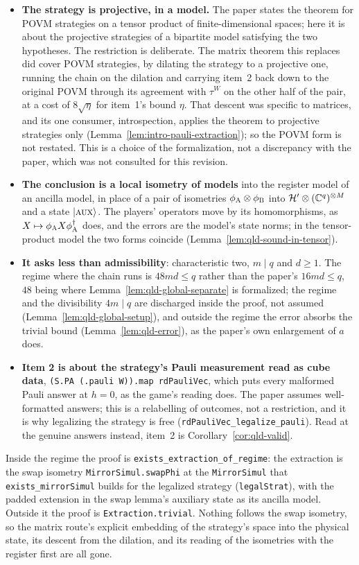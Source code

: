 \begin{itemize}
\item \textbf{The strategy is projective, in a model.} The paper states the theorem for POVM
  strategies on a tensor product of finite-dimensional spaces; here it is about the projective
  strategies of a bipartite model satisfying the two hypotheses. The restriction is deliberate.
  The matrix theorem this replaces did cover POVM strategies, by dilating the strategy to a
  projective one, running the chain on the dilation and carrying item~2 back down to the
  original POVM through its agreement with $\tau^W$ on the other half of the pair, at a cost of
  $8\sqrt{\eta}$ for item~1's bound $\eta$. That descent was specific to matrices, and its one
  consumer, introspection, applies the theorem to projective strategies only
  (Lemma~\ref{lem:intro-pauli-extraction}); so the POVM form is not restated. This is a choice of
  the formalization, not a discrepancy with the paper, which was not consulted for this revision.
\item \textbf{The conclusion is a local isometry of models} into the register model of an ancilla
  model, in place of a pair of isometries $\phi_{\textsc{A}} \otimes \phi_{\textsc{B}}$ into
  $\mathcal{H}' \otimes (\mathbb{C}^q)^{\otimes M}$ and a state $|\textsc{aux}\rangle$. The players' operators move by its
  homomorphisms, as $X \mapsto \phi_{\textsc{A}} X \phi_{\textsc{A}}^\dagger$ does, and the errors are the
  model's state norms; in the tensor-product model the two forms coincide
  (Lemma~\ref{lem:qld-sound-in-tensor}).
\item \textbf{It asks less than admissibility}: characteristic two, $m \mid q$ and $d \geq 1$. The
  regime where the chain runs is $48md \leq q$ rather than the paper's $16md \leq q$, $48$ being
  where Lemma~\ref{lem:qld-global-separate} is formalized; the regime and the divisibility
  $4m \mid q$ are discharged inside the proof, not assumed (Lemma~\ref{lem:qld-global-setup}), and
  outside the regime the error absorbs the trivial bound (Lemma~\ref{lem:qld-error}), as the
  paper's own enlargement of $a$ does.
\item \textbf{Item 2 is about the strategy's Pauli measurement read as cube data},
  \texttt{(S.PA (.pauli W)).map rdPauliVec}, which puts every malformed Pauli answer at $h = 0$,
  as the game's reading does. The paper assumes well-formatted answers; this is a relabelling of
  outcomes, not a restriction, and it is why legalizing the strategy is free
  (\texttt{rdPauliVec\_legalize\_pauli}). Read at the genuine answers instead, item~2 is
  Corollary~\ref{cor:qld-valid}.
\end{itemize}
Inside the regime the proof is \texttt{exists\_extraction\_of\_regime}: the extraction is the swap
isometry \texttt{MirrorSimul.swapPhi} at the \texttt{MirrorSimul} that \texttt{exists\_mirrorSimul}
builds for the legalized strategy (\texttt{legalStrat}), with the padded extension in the swap
lemma's auxiliary state as its ancilla model. Outside it the proof is \texttt{Extraction.trivial}.
Nothing follows the swap isometry, so the matrix route's explicit embedding of the strategy's space
into the physical state, its descent from the dilation, and its reading of the isometries with the
register first are all gone.

